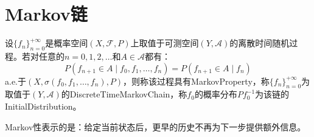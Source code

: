 \section{Markov链}

\begin{definition}
	设$\{f_n\}_{n=0}^{+\infty}$是概率空间$(X,\mathscr{F},P)$上取值于可测空间$(Y,\mathscr{A})$的离散时间随机过程。若对任意的$n=0,1,2,\dots$和$A\in\mathscr{A}$都有：
	\begin{equation*}
		P(f_{n+1}\in A\mid f_0,f_1,\dots,f_n)=P(f_{n+1}\in A\mid f_n)
	\end{equation*}
	 a.e.于$(X,\sigma(f_0,f_1,\dots,f_n),P)$，则称该过程具有\gls{MarkovProperty}，称$\{f_n\}_{n=0}^{+\infty}$为取值于$(Y,\mathscr{A})$的\gls{DiscreteTimeMarkovChain}，称$f_0$的概率分布$Pf_0^{-1}$为该链的\gls{InitialDistribution}。
\end{definition}
Markov性表示的是：给定当前状态后，更早的历史不再为下一步提供额外信息。

